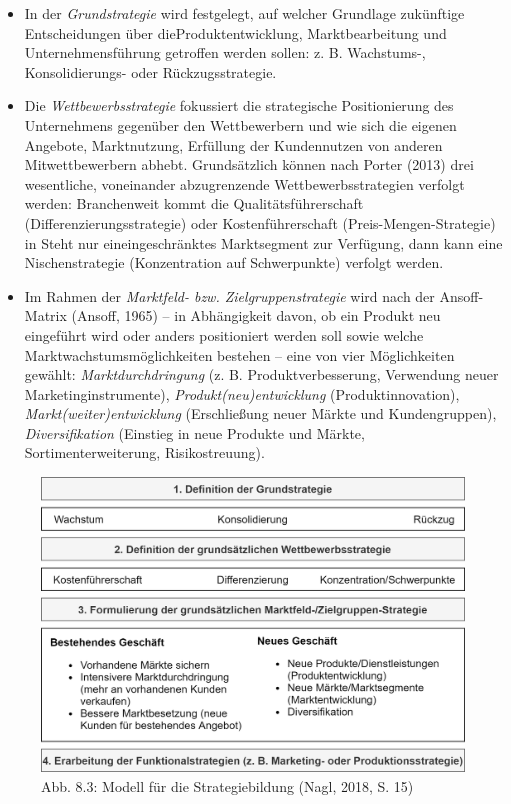 \documentclass[
  letterpaper,
]{book}
\begin{document}
\begin{itemize}
\item
  In der \emph{Grundstrategie }wird festgelegt, auf welcher Grundlage
  zukünftige Entscheidungen über dieProduktentwicklung, Marktbearbeitung
  und Unternehmensführung getroffen werden sollen: z. B. Wachstums-,
  Konsolidierungs- oder Rückzugsstrategie.
\item
  Die \emph{Wettbewerbsstrategie }fokussiert die strategische
  Positionierung des Unternehmens gegenüber den Wettbewerbern und wie
  sich die eigenen Angebote, Marktnutzung, Erfüllung der Kundennutzen
  von anderen Mitwettbewerbern abhebt. Grundsätzlich können nach Porter
  (2013) drei wesentliche, voneinander abzugrenzende
  Wettbewerbsstrategien verfolgt werden: Branchenweit kommt die
  Qualitätsführerschaft (Differenzierungsstrategie) oder
  Kostenführerschaft (Preis-Mengen-Strategie) in Steht nur
  eineingeschränktes Marktsegment zur Verfügung, dann kann eine
  Nischenstrategie (Konzentration auf Schwerpunkte) verfolgt werden.
\item
  Im Rahmen der \emph{Marktfeld- bzw. Zielgruppenstrategie }wird nach
  der Ansoff-Matrix (Ansoff, 1965) -- in Abhängigkeit davon, ob ein
  Produkt neu eingeführt wird oder anders positioniert werden soll sowie
  welche Marktwachstumsmöglichkeiten bestehen -- eine von vier
  Möglichkeiten gewählt: \emph{Marktdurchdringung }(z. B.
  Produktverbesserung, Verwendung neuer Marketinginstrumente),
  \emph{Produkt(neu)entwicklung }(Produktinnovation),
  \emph{Markt(weiter)entwicklung }(Erschließung neuer Märkte und
  Kundengruppen), \emph{Diversifikation }(Einstieg in neue Produkte und
  Märkte, Sortimenterweiterung, Risikostreuung).
\end{itemize}

\begin{figure}

\includegraphics[width=0.75\linewidth,height=\textheight,keepaspectratio]{images/figure83.png} \hfill{}

\caption{Abb. 8.3: Modell für die Strategiebildung (Nagl, 2018, S. 15)}

\end{figure}%
\end{document}
